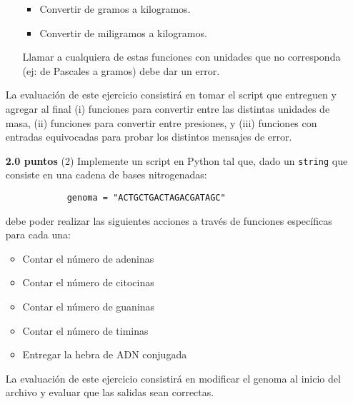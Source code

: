 \documentclass{article}
\begin{document}
\begin{itemize}
\begin{itemize}
\begin{itemize}
                    \item Convertir de gramos a kilogramos.
                    \item Convertir de miligramos a kilogramos.
                \end{itemize}
                Llamar a cualquiera de estas funciones con unidades que no corresponda (ej: de Pascales a gramos) debe dar un error. 
        \end{itemize}
    La evaluación de este ejercicio consistirá en tomar el script que entreguen y agregar al final (i) funciones para convertir entre las distintas unidades de masa, (ii) funciones para convertir entre presiones, y (iii) funciones con entradas equivocadas para probar los distintos mensajes de error. 
    \item[\textbf{2.0 puntos} (2)] Implemente un script en Python tal que, dado un \texttt{string} que consiste en una cadena de bases nitrogenadas:
        \begin{verbatim}
            genoma = "ACTGCTGACTAGACGATAGC"
        \end{verbatim}
    debe poder realizar las siguientes acciones a través de funciones específicas para cada una: 
        \begin{itemize}
            \item Contar el número de adeninas
            \item Contar el número de citocinas
            \item Contar el número de guaninas
            \item Contar el número de timinas
            \item Entregar la hebra de ADN conjugada
        \end{itemize}
    La evaluación de este ejercicio consistirá en modificar el genoma al inicio del archivo y evaluar que las salidas sean correctas. 
    

\end{itemize}
\end{document}
